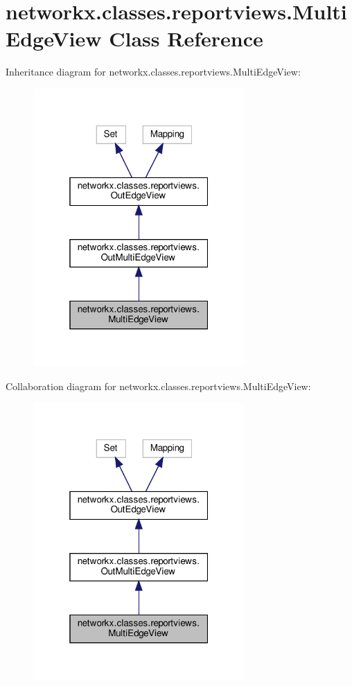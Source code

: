 \hypertarget{classnetworkx_1_1classes_1_1reportviews_1_1MultiEdgeView}{}\section{networkx.\+classes.\+reportviews.\+Multi\+Edge\+View Class Reference}
\label{classnetworkx_1_1classes_1_1reportviews_1_1MultiEdgeView}


Inheritance diagram for networkx.\+classes.\+reportviews.\+Multi\+Edge\+View\+:
\nopagebreak
\begin{figure}[H]
\begin{center}
\leavevmode
\includegraphics[width=229pt]{classnetworkx_1_1classes_1_1reportviews_1_1MultiEdgeView__inherit__graph}
\end{center}
\end{figure}


Collaboration diagram for networkx.\+classes.\+reportviews.\+Multi\+Edge\+View\+:
\nopagebreak
\begin{figure}[H]
\begin{center}
\leavevmode
\includegraphics[width=229pt]{classnetworkx_1_1classes_1_1reportviews_1_1MultiEdgeView__coll__graph}
\end{center}
\end{figure}
